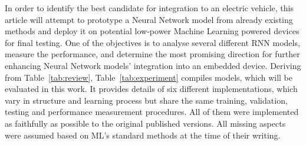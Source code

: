 %
In order to identify the best candidate for integration to an electric vehicle, this article will attempt to prototype a Neural Network model from already existing methods and deploy it on potential low-power Machine Learning powered devices for final testing.
One of the objectives is to analyse several different RNN models, measure the performance, and determine the most promising direction for further enhancing Neural Network models' integration into an embedded device.
Deriving from \mbox{Table~\ref{tab:review}}, \mbox{Table~\ref{tab:experiment}} compiles models, which will be evaluated in this work.
It provides details of six different implementations, which vary in structure and learning process but share the same training, validation, testing and performance measurement procedures.
All of them were implemented as faithfully as possible to the original published versions.
All missing aspects were assumed based on ML's standard methods at the time of their writing.
